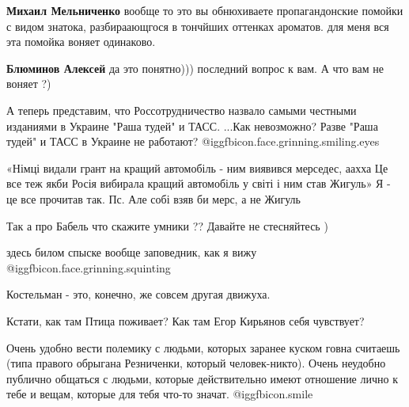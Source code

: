 \begin{itemize}
\begin{itemize}
\textbf{Михаил Мельниченко} вообще то это вы обнюхиваете пропагандонские помойки с видом знатока, разбираающгося в тончйших оттенках ароматов. для меня вся эта помойка воняет одинаково.

\textbf{Блюминов Алексей} да это понятно))) последний вопрос к вам. А что вам не воняет ?)
\end{itemize} %


А теперь представим, что Россотрудничество назвало самыми честными изданиями в Украине "Раша тудей" и ТАСС.
...Как невозможно? Разве "Раша тудей" и ТАСС в Украине не работают?  @igg{fbicon.face.grinning.smiling.eyes} 


«Німці видали грант на кращий автомобіль - ним виявився мерседес, аахха
Це все теж якби Росія вибирала кращий автомобіль у світі і ним став Жигуль»
Я - це все прочитав так.
Пс. Але собі взяв би мерс, а не Жигуль

Так а про Бабель что скажите умники ?? Давайте не стесняйтесь )

здесь билом спыске вообще заповедник, как я вижу  @igg{fbicon.face.grinning.squinting} 


Костельман - это, конечно, же совсем другая движуха.

Кстати, как там Птица поживает? Как там Егор Кирьянов себя чувствует?

Очень удобно вести полемику с людьми, которых заранее куском говна считаешь
(типа правого обрыгана Резниченки, который человек-никто). Очень неудобно
публично общаться с людьми, которые действительно имеют отношение лично к тебе
и вещам, которые для тебя что-то значат.  @igg{fbicon.smile} 

\end{itemize} %
